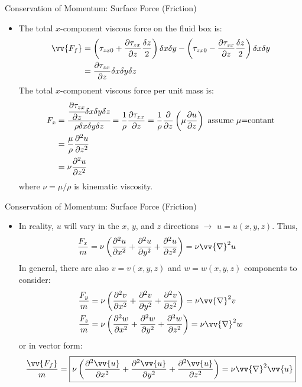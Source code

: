 \begin{frame}{Conservation of Momentum: Surface Force (Friction)}
\begin{itemize}
	\item The total $x$-component viscous force on the fluid box is:
	\begin{align*}
	\vv{F_f} &=\left( \tau_{zx0} + \frac{\partial \tau_{zx}}{\partial z} \frac{\delta z}{2}\right)\delta x \delta y -\left( \tau_{zx0} - \frac{\partial \tau_{zx}}{\partial z} \frac{\delta z}{2}\right)\delta x \delta y\\
	&= \frac{\partial \tau_{zx}}{\partial z}\delta x \delta y \delta z
	\end{align*}
	The total $x$-component viscous force per unit mass is:
	\begin{align*}
		F_x &= \cfrac{\cfrac{\partial \tau_{zx}}{\partial z}\delta x \delta y \delta z}{\rho \delta x \delta y \delta z} = \frac{1}{\rho}\frac{\partial \tau_{zx}}{\partial z} = \frac{1}{\rho}\frac{\partial}{\partial z}\left(\mu \frac{\partial u}{\partial z}\right)\  \text{assume $\mu$=contant}\\
		&= \frac{\mu}{\rho}\frac{\partial^2 u}{\partial z^2}\\
		&= \nu \frac{\partial^2 u}{\partial z^2}
	\end{align*}
	where $\nu = \mu / \rho$ is kinematic viscosity.
\end{itemize}
\end{frame}
\begin{frame}{Conservation of Momentum: Surface Force (Friction)}
\begin{itemize}
	\item In reality, $u$ will vary in the $x$, $y$, and $z$ directions $\rightarrow$ $u = u(x,y,z)$. Thus, 
	\begin{align*}
	\frac{F_x}{m} &= \nu \left(\frac{\partial^2 u}{\partial x^2} + \frac{\partial^2 u}{\partial y^2} + \frac{\partial^2 u}{\partial z^2}\right) = \nu \vv{\nabla}^2 u
	\end{align*}
	In general, there are also $v=v(x,y,z)$ and $w=w(x,y,z)$ components to consider:
	\begin{align*}
	\frac{F_y}{m} &= \nu \left(\frac{\partial^2 v}{\partial x^2} + \frac{\partial^2 v}{\partial y^2} + \frac{\partial^2 v}{\partial z^2}\right) = \nu \vv{\nabla}^2 v\\
	\frac{F_z}{m} &= \nu \left(\frac{\partial^2 w}{\partial x^2} + \frac{\partial^2 w}{\partial y^2} + \frac{\partial^2 w}{\partial z^2}\right) = \nu \vv{\nabla}^2 w
	\end{align*}
	or in vector form:
	$$\frac{\vv{F_f}}{m} = \boxed{\nu \left(\frac{\partial^2 \vv{u}}{\partial x^2} + \frac{\partial^2 \vv{u}}{\partial y^2} + \frac{\partial^2 \vv{u}}{\partial z^2}\right) = \nu \vv{\nabla}^2 \vv{u}}$$
\end{itemize}
\end{frame}
